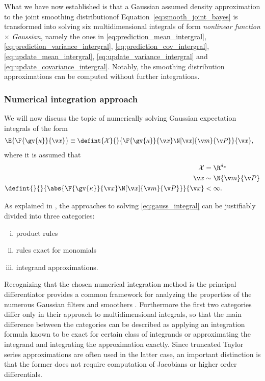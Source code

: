 %
What we have now established is that a Gaussian assumed density approximation to the joint 
smoothing distributionof Equation~\eqref{eq:smooth_joint_bayes} is transformed into solving six
multidimensional integrals of form \emph{nonlinear function} $\times$ \emph{Gaussian}, 
namely the ones in
\eqref{eq:prediction_mean_intergral}, \eqref{eq:prediction_variance_intergral}, \eqref{eq:prediction_cov_intergral},
\eqref{eq:update_mean_intergral}, \eqref{eq:update_variance_intergral} and
\eqref{eq:update_covariance_intergral}. 
Notably, the smoothing distribution approximations can be computed
without further integrations.

\subsubsection{Numerical integration approach}
 We will now discuss the topic of numerically solving Gaussian 
 expectation integrals of the form
 \begin{align}
	\E{\F{\gv{\kappa}}{\x}}&\equiv \defint{\mathcal{X}}{}{\F{\gv{\kappa}}{\x}\N[\x]{\m}{\P}}{\x},
	\label{eq:gauss_integral}
\end{align}%
where it is assumed that 
\begin{align*}
	\mathcal{X} &= \R^{d_x}\\
	\x &\sim \N{\m}{\P}\\
	\defint{}{}{\abs{\F{\gv{\kappa}}{\x}\N[\x]{\m}{\P}}}{\x} & < \infty. 
\end{align*}

As explained in \textcite{Wu2006}, the approaches to solving \eqref{eq:gauss_integral}
can be justifiably divided into three categories: 
\begin{enumerate}[i)] \addtolength{\leftskip}{.5cm} \itemsep1pt \parskip0pt 
  \item product rules
  \item rules exact for monomials
  \item integrand approximations.
\end{enumerate}
Recognizing that the chosen numerical integration method is the principal differentiator provides a 
common framework for analyzing the properties of the numerous Gaussian filters and smoothers 
\parencite{Sarkka2010, Sarkka2013, Ito2000,Wu2006}.
Furthermore the first two categories differ only in their approach to multidimensional integrals,
so that the main difference between the categories can be described
as applying an integration formula known to be exact for certain class of integrands
or approximating the integrand and integrating the approximation exactly.
Since truncated Taylor series approximations are often used in the latter case, an important distinction
is that the former does not require computation of Jacobians or higher order differentials. 


